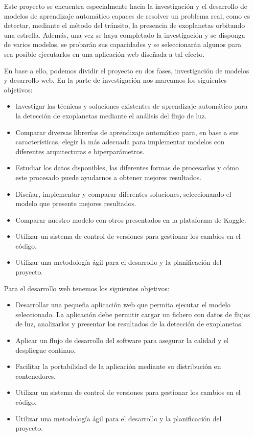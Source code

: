 \label{sec:objetivos-del-proyecto}

Este proyecto se encuentra especialmente hacia la investigación y el desarrollo de modelos de aprendizaje automático capaces de resolver un problema real, como es detectar, mediante el método del tránsito, la presencia de exoplanetas orbitando una estrella. Además, una vez se haya completado la investigación y se disponga de varios modelos, se probarán sus capacidades y se seleccionarán algunos para sea posible ejecutarlos en una aplicación web diseñada a tal efecto. 

En base a ello, podemos dividir el proyecto en dos fases, investigación de modelos y desarrollo web. En la parte de investigación nos marcamos los siguientes objetivos:

\begin{itemize}
    \item Investigar las técnicas y soluciones existentes de aprendizaje automático para la detección de exoplanetas mediante el análisis del flujo de luz.
    \item Comparar diversas librerías de aprendizaje automático para, en base a sus características, elegir la más adecuada para implementar modelos con diferentes arquitecturas e hiperparámetros.
    \item Estudiar los datos disponibles, las diferentes formas de procesarlos y cómo este procesado puede ayudarnos a obtener mejores resultados.
    \item Diseñar, implementar y comparar diferentes soluciones, seleccionando el modelo que presente mejores resultados.
    \item Comparar nuestro modelo con otros presentados en la plataforma de Kaggle.    
    \item Utilizar un sistema de control de versiones para gestionar los cambios en el código.
    \item Utilizar una metodología ágil para el desarrollo y la planificación del proyecto.
\end{itemize}

Para el desarrollo web tenemos los siguientes objetivos:

\begin{itemize}
    \item Desarrollar una pequeña aplicación web que permita ejecutar el modelo seleccionado. La aplicación debe permitir cargar un fichero con datos de flujos de luz, analizarlos y presentar los resultados de la detección de exoplanetas.
    \item Aplicar un flujo de desarrollo del software para asegurar la calidad y el despliegue continuo.
    \item Facilitar la portabilidad de la aplicación mediante su distribución en contenedores.
    \item Utilizar un sistema de control de versiones para gestionar los cambios en el código.
    \item Utilizar una metodología ágil para el desarrollo y la planificación del proyecto.    
\end{itemize}